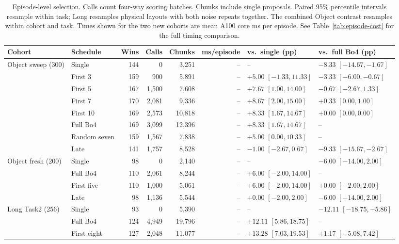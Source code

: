 \begin{table}[t]
\centering\small\setlength{\tabcolsep}{3.5pt}
\caption{Episode-level selection. Calls count four-way scoring batches. Chunks include single proposals. Paired 95\% percentile intervals resample within task; Long resamples physical layouts with both noise repeats together. The combined Object contrast resamples within cohort and task. Times shown for the two new cohorts are mean A100 core ms per episode. See Table~\ref{tab:episode-cost} for the full timing comparison.}
\label{tab:scheduled}
\begin{tabular}{@{}llrrrrll@{}}\toprule
Cohort & Schedule & Wins & Calls & Chunks & ms/episode & vs.\ single (pp) & vs.\ full Bo4 (pp) \\ \midrule
Object sweep (300) & Single & 144 & 0 & 3,251 & -- & -- & $-8.33$ $[-14.67, -1.67]$ \\
 & First 3 & 159 & 900 & 5,891 & -- & $+5.00$ $[-1.33, 11.33]$ & $-3.33$ $[-6.00, -0.67]$ \\
 & First 5 & 167 & 1,500 & 7,608 & -- & $+7.67$ $[1.00, 14.00]$ & $-0.67$ $[-2.67, 1.33]$ \\
 & First 7 & 170 & 2,081 & 9,336 & -- & $+8.67$ $[2.00, 15.00]$ & $+0.33$ $[0.00, 1.00]$ \\
 & First 10 & 169 & 2,573 & 10,818 & -- & $+8.33$ $[1.67, 14.67]$ & $+0.00$ $[0.00, 0.00]$ \\
 & Full Bo4 & 169 & 3,099 & 12,396 & -- & $+8.33$ $[1.67, 14.67]$ & -- \\
 & Random seven & 159 & 1,567 & 7,838 & -- & $+5.00$ $[0.00, 10.33]$ & -- \\
 & Late & 141 & 1,757 & 8,528 & -- & $-1.00$ $[-2.67, 0.67]$ & $-9.33$ $[-15.67, -2.67]$ \\
\addlinespace
Object fresh (200) & Single & 98 & 0 & 2,140 & -- & -- & $-6.00$ $[-14.00, 2.00]$ \\
 & Full Bo4 & 110 & 2,061 & 8,244 & -- & $+6.00$ $[-2.00, 14.00]$ & -- \\
 & First five & 110 & 1,000 & 5,061 & -- & $+6.00$ $[-2.00, 14.00]$ & $+0.00$ $[-2.00, 2.00]$ \\
 & Late & 98 & 1,136 & 5,544 & -- & $+0.00$ $[-2.00, 2.00]$ & $-6.00$ $[-14.00, 2.00]$ \\
\addlinespace
Long Task2 (256) & Single & 93 & 0 & 5,390 & -- & -- & $-12.11$ $[-18.75, -5.86]$ \\
 & Full Bo4 & 124 & 4,949 & 19,796 & -- & $+12.11$ $[5.86, 18.75]$ & -- \\
 & First eight & 127 & 2,048 & 11,077 & -- & $+13.28$ $[7.03, 19.53]$ & $+1.17$ $[-5.08, 7.42]$ \\

\end{tabular}
\end{table}
